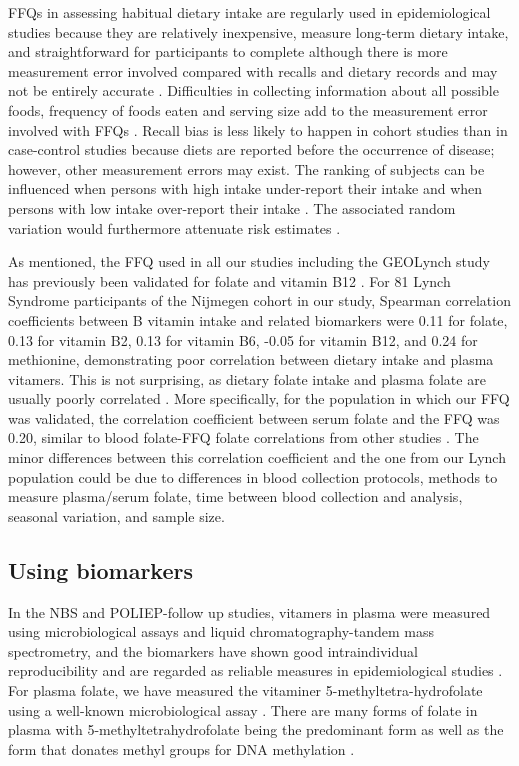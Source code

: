 \noindent FFQs in assessing habitual dietary intake are regularly used in epidemiological studies because they are relatively inexpensive, measure long-term dietary intake, and straightforward for participants to complete \cite{c724} although there is more measurement error involved compared with recalls and dietary records and may not be entirely accurate \cite{c725,c726}. Difficulties in collecting information about all possible foods, frequency of foods eaten and serving size add to the measurement error involved with FFQs \cite{c727}. Recall bias is less likely to happen in cohort studies than in case-control studies because diets are reported before the occurrence of disease; however, other measurement errors may exist. The ranking of subjects can be influenced when persons with high intake under-report their intake and when persons with low intake over-report their intake \cite{c728}. The associated random variation would furthermore attenuate risk estimates \cite{c729}.

\noindent As mentioned, the FFQ used in all our studies including the GEOLynch study has previously been validated for folate and vitamin B12 \cite{c717}. For 81 Lynch Syndrome participants of the Nijmegen cohort in our study, Spearman correlation coefficients between B vitamin intake and related biomarkers were 0.11 for folate, 0.13 for vitamin B2, 0.13 for vitamin B6, -0.05 for vitamin B12, and 0.24 for methionine, demonstrating poor correlation between dietary intake and plasma vitamers. This is not surprising, as dietary folate intake and plasma folate are usually poorly correlated \cite{c722,c730,c731}. More specifically, for the population in which our FFQ was validated, the correlation coefficient between serum folate and the FFQ was 0.20, similar to blood folate-FFQ folate correlations from other studies \cite{c722,c730,c731}. The minor differences between this correlation coefficient and the one from our Lynch population could be due to differences in blood collection protocols, methods to measure plasma/serum folate, time between blood collection and analysis, seasonal variation, and sample size.

\subsection{Using biomarkers} %
\noindent In the NBS and POLIEP-follow up studies, vitamers in plasma were measured using microbiological assays and liquid chromatography-tandem mass spectrometry, and the biomarkers have shown good intraindividual reproducibility and are regarded as reliable measures in epidemiological studies \cite{c732}. For plasma folate, we have measured the vitaminer 5-methyltetra-hydrofolate using a well-known microbiological assay \cite{c733}. There are many forms of folate in plasma with 5-methyltetrahydrofolate being the predominant form as well as the form that donates methyl groups for DNA methylation \cite{c734}.

